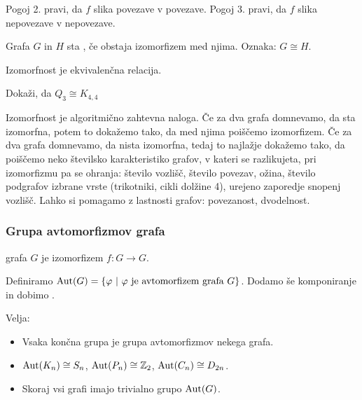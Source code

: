 \begin{opomba}
    Pogoj 2. pravi, da $f$ slika povezave v povezave. Pogoj 3. pravi, da $f$ slika nepovezave v nepovezave.
\end{opomba}

\begin{definicija}
    Grafa $G$ in $H$ sta , če obstaja izomorfizem med njima. Oznaka: $G \cong H$.
\end{definicija}

\begin{opomba}
    Izomorfnost je ekvivalenčna relacija.
\end{opomba}

\begin{primer}
    Dokaži, da $Q_3 \cong K_{4,4}$
\end{primer}

\begin{opomba}
    Izomorfnost je algoritmično zahtevna naloga. Če za dva grafa domnevamo, da sta izomorfna, potem to dokažemo tako, da med njima poiščemo izomorfizem. Če za dva grafa domnevamo, da nista izomorfna, tedaj to najlažje dokažemo tako, da poiščemo neko številsko karakteristiko grafov, v kateri se razlikujeta, pri izomorfizmu pa se ohranja: število vozlišč, število povezav, ožina, število podgrafov izbrane vrste (trikotniki, cikli dolžine 4), urejeno zaporedje snopenj vozlišč. Lahko si pomagamo z lastnosti grafov: povezanost, dvodelnost.
\end{opomba}

\subsubsection*{Grupa avtomorfizmov grafa}
\begin{definicija}
     grafa $G$ je izomorfizem $f: G \to G$.
\end{definicija}

Definiramo $\operatorname{Aut} (G) = \left\{\varphi \ | \ \varphi \text{ je avtomorfizem grafa } G\right\}$. Dodamo še komponiranje in dobimo .

\begin{opomba}
    Velja:
    \begin{itemize}
        \item Vsaka končna grupa je grupa avtomorfizmov nekega grafa.
        \item $\operatorname{Aut}(K_n) \cong S_n$, $\operatorname{Aut}(P_n) \cong \mathbb{Z}_2$, $\operatorname{Aut}(C_n) \cong D_{2n}$.
        \item Skoraj vsi grafi imajo trivialno grupo $\operatorname{Aut}(G)$.
    \end{itemize}
\end{opomba}

